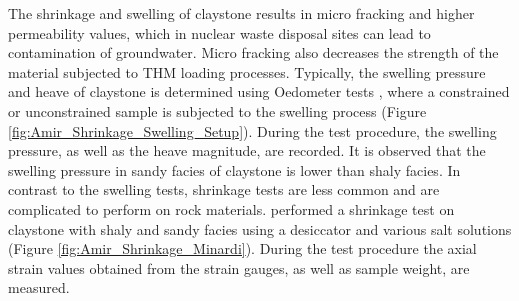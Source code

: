 The shrinkage and swelling of claystone results in micro fracking and higher permeability values, which in nuclear waste disposal sites can lead to contamination of groundwater. Micro fracking also decreases the strength of the material subjected to THM  loading processes. Typically, the swelling pressure and heave of claystone is determined using Oedometer tests \cite{Peronetal2009}, where a constrained or unconstrained sample is subjected to the swelling process (Figure \ref{fig:Amir_Shrinkage_Swelling_Setup}). During the test procedure, the swelling pressure, as well as the heave magnitude, are recorded. It is observed that the swelling pressure in sandy facies of claystone is lower than shaly facies. In contrast to the swelling tests, shrinkage tests are less common and are complicated to perform on rock materials. \cite{Minardietal2016} performed a shrinkage test on claystone with shaly and sandy facies using a desiccator and various salt solutions (Figure  \ref{fig:Amir_Shrinkage_Minardi}). During the test procedure the axial strain values obtained from the strain gauges, as well as sample weight, are measured.

